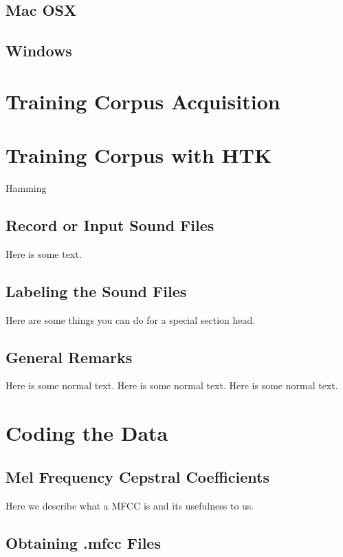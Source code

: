 \documentclass{wileySev}
\begin{document}
\section{Mac OSX}
\section{Windows}

\chapter{Training Corpus Acquisition}

\chapter{Training Corpus with HTK}

{Hamming \cite{hamming}}


\section{Record or Input Sound Files}
Here is some text.


\section{Labeling the Sound Files}
Here are some things you can do for a special
section head.

\section{General Remarks}
Here is some normal text.
Here is some normal text.
Here is some normal text.



\chapter{Coding the Data}

\section{Mel Frequency Cepstral Coefficients}
Here we describe what a MFCC is and its usefulness to us.

\section{Obtaining .mfcc Files}
\end{document}
